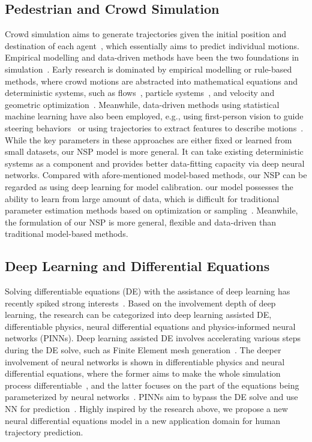 \documentclass[runningheads]{llncs}
\begin{document}
\subsection{Pedestrian and Crowd Simulation}
Crowd simulation aims to generate trajectories given the initial position and destination of each agent~\cite{vantoll_algorithms_2021}, which essentially aims to predict individual motions. Empirical modelling and data-driven methods have been the two foundations in simulation~\cite{narain2009aggregate,lopez2019character}. Early research is dominated by empirical modelling or rule-based methods, where crowd motions are abstracted into mathematical equations and deterministic systems, such as flows~\cite{narain2009aggregate}, particle systems~\cite{helbing1995social}, and velocity and geometric optimization~\cite{vanDenBerg_reciprocal_2008,shen2018data}. Meanwhile, data-driven methods using statistical machine learning have also been employed, e.g., using first-person vision to guide steering behaviors~\cite{lopez2019character} or using trajectories to extract features to describe motions~\cite{karamouzas2018crowd,wei2020simulating}. While the key parameters in these approaches are either fixed or learned from small datasets, our NSP model is more general. It can take existing deterministic systems as a component and provides better data-fitting capacity via deep neural networks. Compared with afore-mentioned model-based methods, our NSP can be regarded as using deep learning for model calibration. our model possesses the ability to learn from large amount of data, which is difficult for traditional parameter estimation methods based on optimization or sampling~{\cite{wan2017learning}}. Meanwhile, the formulation of our NSP is more general, flexible and data-driven than traditional model-based methods.

\subsection{Deep Learning and Differential Equations}
Solving differentiable equations (DE) with the assistance of deep learning has recently spiked strong interests~\cite{chen2018neural,zhong2019symplectic,zubov2021NeuralPDE,Karniadakis_datadriven_2021}. Based on the involvement depth of deep learning, the research can be categorized into deep learning assisted DE, differentiable physics, neural differential equations and physics-informed neural networks (PINNs). Deep learning assisted DE involves accelerating various steps during the DE solve, such as Finite Element mesh generation~\cite{Zhang_MeshingNet_2020,zhang_meshingnet3d_2021}. The deeper involvement of neural networks is shown in differentiable physics and neural differential equations, where the former aims to make the whole simulation process differentiable~\cite{Gong_finegrained_2022,liang2019differentiable,Werling2021fast}, and the latter focuses on the part of the equations being parameterized by neural networks~\cite{Shen_high_2021}. PINNs aim to bypass the DE solve and use NN for prediction~\cite{raissi2019physics,cai2022physics}. Highly inspired by the research above, we propose a new neural differential equations model in a new application domain for human trajectory prediction.
\end{document}
